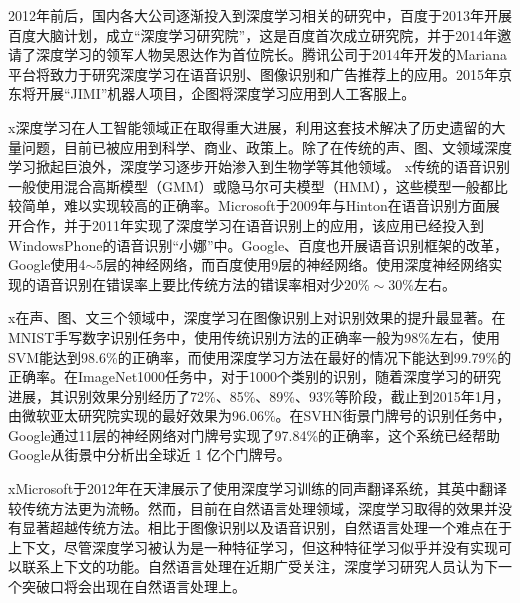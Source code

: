 2012年前后，国内各大公司逐渐投入到深度学习相关的研究中，百度于2013年开展百度大脑计划，成立“深度学习研究院”，这是百度首次成立研究院，并于2014年邀请了深度学习的领军人物吴恩达作为首位院长。腾讯公司于2014年开发的Mariana平台将致力于研究深度学习在语音识别、图像识别和广告推荐上的应用。2015年京东将开展“JIMI”机器人项目，企图将深度学习应用到人工客服上。


x深度学习在人工智能领域正在取得重大进展，利用这套技术解决了历史遗留的大量问题，目前已被应用到科学、商业、政策上。除了在传统的声、图、文领域深度学习掀起巨浪外，深度学习逐步开始渗入到生物学等其他领域。
x传统的语音识别一般使用混合高斯模型（GMM）或隐马尔可夫模型（HMM），这些模型一般都比较简单，难以实现较高的正确率。Microsoft于2009年与Hinton在语音识别方面展开合作，并于2011年实现了深度学习在语音识别上的应用，该应用已经投入到WindowsPhone的语音识别“小娜”中。Google、百度也开展语音识别框架的改革，Google使用4$\sim$5层的神经网络，而百度使用9层的神经网络。使用深度神经网络实现的语音识别在错误率上要比传统方法的错误率相对少$20\%\sim  30\%$左右。

x在声、图、文三个领域中，深度学习在图像识别上对识别效果的提升最显著。在MNIST手写数字识别任务中，使用传统识别方法的正确率一般为98\%左右，使用SVM能达到98.6\%的正确率，而使用深度学习方法在最好的情况下能达到99.79\%的正确率。在ImageNet1000任务中，对于1000个类别的识别，随着深度学习的研究进展，其识别效果分别经历了72\%、85\%、89\%、93\%等阶段，截止到2015年1月，由微软亚太研究院实现的最好效果为96.06\%。在SVHN街景门牌号的识别任务中，Google通过11层的神经网络对门牌号实现了97.84\%的正确率，这个系统已经帮助Google从街景中分析出全球近 1 亿个门牌号。

xMicrosoft于2012年在天津展示了使用深度学习训练的同声翻译系统，其英中翻译较传统方法更为流畅。然而，目前在自然语言处理领域，深度学习取得的效果并没有显著超越传统方法。相比于图像识别以及语音识别，自然语言处理一个难点在于上下文，尽管深度学习被认为是一种特征学习，但这种特征学习似乎并没有实现可以联系上下文的功能。自然语言处理在近期广受关注，深度学习研究人员认为下一个突破口将会出现在自然语言处理上。






